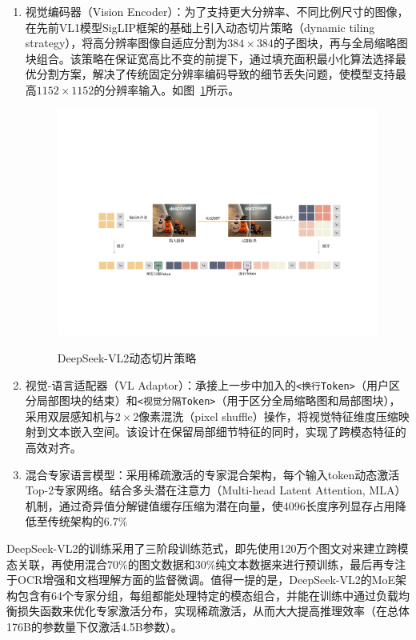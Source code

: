 \begin{enumerate}
    \item 视觉编码器（Vision Encoder）：为了支持更大分辨率、不同比例尺寸的图像，在先前VL1模型SigLIP框架的基础上引入动态切片策略（dynamic tiling strategy），将高分辨率图像自适应分割为$384\times384$的子图块，再与全局缩略图块组合。该策略在保证宽高比不变的前提下，通过填充面积最小化算法选择最优分割方案，解决了传统固定分辨率编码导致的细节丢失问题，使模型支持最高$1152\times1152$的分辨率输入。如图~\ref{fig:deepseek_vl2_cropping_strategy}所示。
    \begin{figure}[ht]
        \centering
        \includegraphics[width=1\textwidth]
        {figures/deepseek_vl2_cropping_strategy.pdf}\\
        \caption{DeepSeek-VL2动态切片策略}
        \label{fig:deepseek_vl2_cropping_strategy} %
    \end{figure}
    \item 视觉-语言适配器（VL Adaptor）：承接上一步中加入的\verb|<换行Token>|（用户区分局部图块的结束）和\verb|<视觉分隔Token>|（用于区分全局缩略图和局部图块），采用双层感知机与$2\times2$像素混洗（pixel shuffle）操作，将视觉特征维度压缩映射到文本嵌入空间。该设计在保留局部细节特征的同时，实现了跨模态特征的高效对齐。
    \item 混合专家语言模型：采用稀疏激活的专家混合架构，每个输入token动态激活Top-2专家网络。结合多头潜在注意力（Multi-head Latent Attention, MLA）机制，通过奇异值分解键值缓存压缩为潜在向量，使4096长度序列显存占用降低至传统架构的$6.7\%$
\end{enumerate}

DeepSeek-VL2的训练采用了三阶段训练范式，即先使用120万个图文对来建立跨模态关联，再使用混合$70\%$的图文数据和$30\%$纯文本数据来进行预训练，最后再专注于OCR增强和文档理解方面的监督微调。值得一提的是，DeepSeek-VL2的MoE架构包含有64个专家分组，每组都能处理特定的模态组合，并能在训练中通过负载均衡损失函数来优化专家激活分布，实现稀疏激活，从而大大提高推理效率（在总体176B的参数量下仅激活4.5B参数）。


